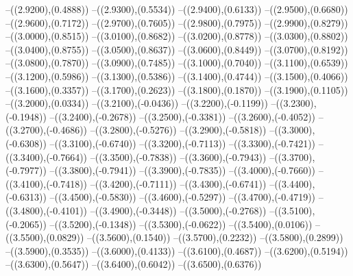 {	--({\sx*(2.9200)},{\sy*(0.4888)})
	--({\sx*(2.9300)},{\sy*(0.5534)})
	--({\sx*(2.9400)},{\sy*(0.6133)})
	--({\sx*(2.9500)},{\sy*(0.6680)})
	--({\sx*(2.9600)},{\sy*(0.7172)})
	--({\sx*(2.9700)},{\sy*(0.7605)})
	--({\sx*(2.9800)},{\sy*(0.7975)})
	--({\sx*(2.9900)},{\sy*(0.8279)})
	--({\sx*(3.0000)},{\sy*(0.8515)})
	--({\sx*(3.0100)},{\sy*(0.8682)})
	--({\sx*(3.0200)},{\sy*(0.8778)})
	--({\sx*(3.0300)},{\sy*(0.8802)})
	--({\sx*(3.0400)},{\sy*(0.8755)})
	--({\sx*(3.0500)},{\sy*(0.8637)})
	--({\sx*(3.0600)},{\sy*(0.8449)})
	--({\sx*(3.0700)},{\sy*(0.8192)})
	--({\sx*(3.0800)},{\sy*(0.7870)})
	--({\sx*(3.0900)},{\sy*(0.7485)})
	--({\sx*(3.1000)},{\sy*(0.7040)})
	--({\sx*(3.1100)},{\sy*(0.6539)})
	--({\sx*(3.1200)},{\sy*(0.5986)})
	--({\sx*(3.1300)},{\sy*(0.5386)})
	--({\sx*(3.1400)},{\sy*(0.4744)})
	--({\sx*(3.1500)},{\sy*(0.4066)})
	--({\sx*(3.1600)},{\sy*(0.3357)})
	--({\sx*(3.1700)},{\sy*(0.2623)})
	--({\sx*(3.1800)},{\sy*(0.1870)})
	--({\sx*(3.1900)},{\sy*(0.1105)})
	--({\sx*(3.2000)},{\sy*(0.0334)})
	--({\sx*(3.2100)},{\sy*(-0.0436)})
	--({\sx*(3.2200)},{\sy*(-0.1199)})
	--({\sx*(3.2300)},{\sy*(-0.1948)})
	--({\sx*(3.2400)},{\sy*(-0.2678)})
	--({\sx*(3.2500)},{\sy*(-0.3381)})
	--({\sx*(3.2600)},{\sy*(-0.4052)})
	--({\sx*(3.2700)},{\sy*(-0.4686)})
	--({\sx*(3.2800)},{\sy*(-0.5276)})
	--({\sx*(3.2900)},{\sy*(-0.5818)})
	--({\sx*(3.3000)},{\sy*(-0.6308)})
	--({\sx*(3.3100)},{\sy*(-0.6740)})
	--({\sx*(3.3200)},{\sy*(-0.7113)})
	--({\sx*(3.3300)},{\sy*(-0.7421)})
	--({\sx*(3.3400)},{\sy*(-0.7664)})
	--({\sx*(3.3500)},{\sy*(-0.7838)})
	--({\sx*(3.3600)},{\sy*(-0.7943)})
	--({\sx*(3.3700)},{\sy*(-0.7977)})
	--({\sx*(3.3800)},{\sy*(-0.7941)})
	--({\sx*(3.3900)},{\sy*(-0.7835)})
	--({\sx*(3.4000)},{\sy*(-0.7660)})
	--({\sx*(3.4100)},{\sy*(-0.7418)})
	--({\sx*(3.4200)},{\sy*(-0.7111)})
	--({\sx*(3.4300)},{\sy*(-0.6741)})
	--({\sx*(3.4400)},{\sy*(-0.6313)})
	--({\sx*(3.4500)},{\sy*(-0.5830)})
	--({\sx*(3.4600)},{\sy*(-0.5297)})
	--({\sx*(3.4700)},{\sy*(-0.4719)})
	--({\sx*(3.4800)},{\sy*(-0.4101)})
	--({\sx*(3.4900)},{\sy*(-0.3448)})
	--({\sx*(3.5000)},{\sy*(-0.2768)})
	--({\sx*(3.5100)},{\sy*(-0.2065)})
	--({\sx*(3.5200)},{\sy*(-0.1348)})
	--({\sx*(3.5300)},{\sy*(-0.0622)})
	--({\sx*(3.5400)},{\sy*(0.0106)})
	--({\sx*(3.5500)},{\sy*(0.0829)})
	--({\sx*(3.5600)},{\sy*(0.1540)})
	--({\sx*(3.5700)},{\sy*(0.2232)})
	--({\sx*(3.5800)},{\sy*(0.2899)})
	--({\sx*(3.5900)},{\sy*(0.3535)})
	--({\sx*(3.6000)},{\sy*(0.4133)})
	--({\sx*(3.6100)},{\sy*(0.4687)})
	--({\sx*(3.6200)},{\sy*(0.5194)})
	--({\sx*(3.6300)},{\sy*(0.5647)})
	--({\sx*(3.6400)},{\sy*(0.6042)})
	--({\sx*(3.6500)},{\sy*(0.6376)})
}
